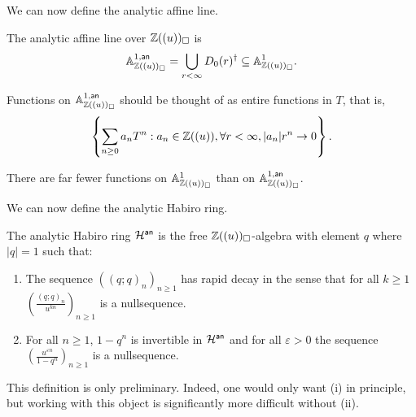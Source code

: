 We can now define the analytic affine line.
\begin{definition}\label{def: analytic affine line over analytic Habiro}
    The analytic affine line over $\mathbb{Z}((u))_{\square}$ is 
    $$\mathbb{A}^{1,\mathsf{an}}_{\mathbb{Z}((u))_{\square}}=\bigcup_{r<\infty}D_{0}(r)^{\dagger}\subseteq\mathbb{A}^{1}_{\mathbb{Z}((u))_{\square}}.$$
\end{definition}
Functions on $\mathbb{A}^{1,\mathsf{an}}_{\mathbb{Z}((u))_{\square}}$ should be thought of as entire functions in $T$, that is, 
$$\left\{\sum_{n\geq0}a_{n}T^{n}:a_{n}\in\mathbb{Z}((u)),\forall r<\infty, |a_{n}|r^{n}\to0\right\}.$$
\begin{remark}
    There are far fewer functions on $\mathbb{A}^{1}_{\mathbb{Z}((u))_{\square}}$ than on $\mathbb{A}^{1,\mathsf{an}}_{\mathbb{Z}((u))_{\square}}$. 
\end{remark}
We can now define the analytic Habiro ring. 
\begin{definition}\label{def: analytic Habiro ring}
    The analytic Habiro ring $\mathcal{H}^{\mathsf{an}}$ is the free $\mathbb{Z}((u))_{\square}$-algebra with element $q$ where $|q|=1$ such that:
    \begin{enumerate}[label=(\roman*)]
        \item The sequence $((q;q)_{n})_{n\geq1}$ has rapid decay in the sense that for all $k\geq 1$ $\left(\frac{(q;q)_{n}}{u^{kn}}\right)_{n\geq1}$ is a nullsequence. 
        \item For all $n\geq 1$, $1-q^{n}$ is invertible in $\mathcal{H}^{\mathsf{an}}$ and for all $\varepsilon>0$ the sequence $\left(\frac{u^{\varepsilon n}}{1-q^{n}}\right)_{n\geq1}$ is a nullsequence. 
    \end{enumerate}
\end{definition}
\begin{remark}
    This definition is only preliminary. Indeed, one would only want (i) in principle, but working with this object is significantly more difficult without (ii). 
\end{remark}
 
